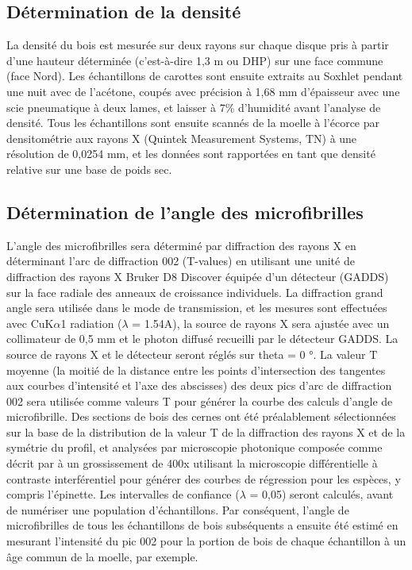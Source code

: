 \documentclass{report}
\begin{document}
\subsection*{Détermination de la densité}
La densité du bois est mesurée sur deux rayons sur chaque disque pris à partir d'une hauteur déterminée (c'est-à-dire 1,3 m ou DHP) sur une face commune (face Nord). Les échantillons de carottes sont ensuite extraits au Soxhlet pendant une nuit avec de l'acétone, coupés avec précision à 1,68 mm d'épaisseur avec une scie pneumatique à deux lames, et laisser à 7\% d'humidité avant l'analyse de densité. Tous les échantillons sont ensuite scannés de la moelle à l'écorce par densitométrie aux rayons X (Quintek Measurement Systems, TN) à une résolution de 0,0254 mm, et les données sont rapportées en tant que densité relative sur une base de poids sec. 

\subsection*{Détermination de l'angle des microfibrilles}
L'angle des microfibrilles sera déterminé par diffraction des rayons X en déterminant l'arc de diffraction 002 (T-values) en utilisant une unité de diffraction des rayons X Bruker D8 Discover équipée d'un détecteur (GADDS) sur la face radiale des anneaux de croissance individuels. La diffraction grand angle sera utilisée dans le mode de transmission, et les mesures sont effectuées avec CuK$\alpha$1 radiation ($\lambda$ = 1.54A), la source de rayons X sera ajustée avec un collimateur de 0,5 mm et le photon diffusé recueilli par le détecteur GADDS. La source de rayons X et le détecteur seront réglés sur theta = 0 °. La valeur T moyenne (la moitié de la distance entre les points d'intersection des tangentes aux courbes d'intensité et l'axe des abscisses) des deux pics d'arc de diffraction 002 sera utilisée comme valeurs T pour générer la courbe des calculs d'angle de microfibrille. Des sections de bois des cernes ont été préalablement sélectionnées sur la base de la distribution de la valeur T de la diffraction des rayons X et de la symétrie du profil, et analysées par microscopie photonique composée comme décrit par \cite{Wang2001} à un grossissement de 400x utilisant la microscopie différentielle à contraste interférentiel pour générer des courbes de régression pour les espèces, y compris l'épinette. Les intervalles de confiance ($\lambda$ = 0,05) seront calculés, avant de numériser une population d'échantillons. Par conséquent, l'angle de microfibrilles de tous les échantillons de bois subséquents a ensuite été estimé en mesurant l'intensité du pic 002 pour la portion de bois de chaque échantillon à un âge commun de la moelle, par exemple.
\end{document}
